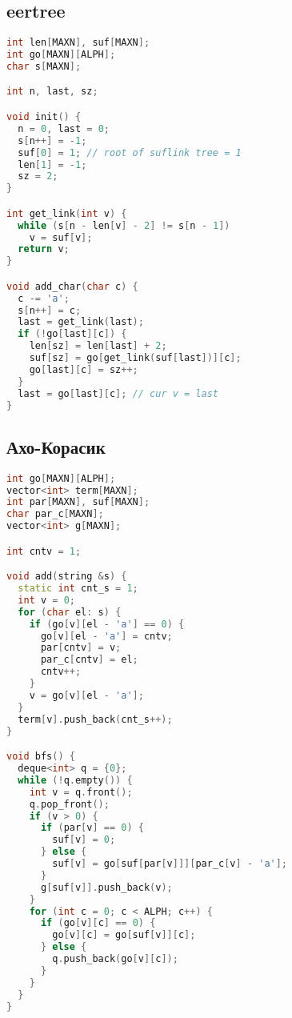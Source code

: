 \documentclass[9pt,a4paper,landscape,twosided]{extarticle}
\begin{document}
\begin{multicols*}{3}
\subsection{eertree}
\begin{lstlisting}[language=C++]
int len[MAXN], suf[MAXN];
int go[MAXN][ALPH];
char s[MAXN];

int n, last, sz;

void init() {
  n = 0, last = 0;
  s[n++] = -1;
  suf[0] = 1; // root of suflink tree = 1
  len[1] = -1;
  sz = 2;
}

int get_link(int v) {
  while (s[n - len[v] - 2] != s[n - 1])
    v = suf[v];
  return v;
}

void add_char(char c) {
  c -= 'a';
  s[n++] = c;
  last = get_link(last);
  if (!go[last][c]) {
    len[sz] = len[last] + 2;
    suf[sz] = go[get_link(suf[last])][c];
    go[last][c] = sz++;
  }
  last = go[last][c]; // cur v = last
}
\end{lstlisting}

\subsection{Ахо-Корасик}
\begin{lstlisting}[language=C++]
int go[MAXN][ALPH];
vector<int> term[MAXN];
int par[MAXN], suf[MAXN];
char par_c[MAXN];
vector<int> g[MAXN];

int cntv = 1;

void add(string &s) {
  static int cnt_s = 1;
  int v = 0;
  for (char el: s) {
    if (go[v][el - 'a'] == 0) {
      go[v][el - 'a'] = cntv;
      par[cntv] = v;
      par_c[cntv] = el;
      cntv++;
    }
    v = go[v][el - 'a'];
  }
  term[v].push_back(cnt_s++);
}

void bfs() {
  deque<int> q = {0};
  while (!q.empty()) {
    int v = q.front();
    q.pop_front();
    if (v > 0) {
      if (par[v] == 0) {
        suf[v] = 0;
      } else {
        suf[v] = go[suf[par[v]]][par_c[v] - 'a'];
      }
      g[suf[v]].push_back(v);
    }
    for (int c = 0; c < ALPH; c++) {
      if (go[v][c] == 0) {
        go[v][c] = go[suf[v]][c];
      } else {
        q.push_back(go[v][c]);
      }
    }
  }
}
\end{lstlisting}


\end{multicols*}
\end{document}
